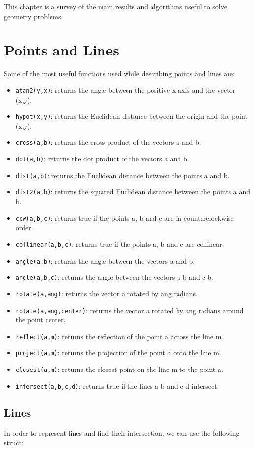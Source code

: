 This chapter is a survey of the main results and algorithms useful to solve geometry problems.

\section{Points and Lines}

Some of the most useful functions used while describing points and lines are:

\begin{itemize}
    \item \texttt{atan2(y,x)}: returns the angle between the positive x-axis and the vector (x,y).
    \item \texttt{hypot(x,y)}: returns the Euclidean distance between the origin and the point (x,y).
    \item \texttt{cross(a,b)}: returns the cross product of the vectors a and b.
    \item \texttt{dot(a,b)}: returns the dot product of the vectors a and b.
    \item \texttt{dist(a,b)}: returns the Euclidean distance between the points a and b.
    \item \texttt{dist2(a,b)}: returns the squared Euclidean distance between the points a and b.
    \item \texttt{ccw(a,b,c)}: returns true if the points a, b and c are in counterclockwise order.
    \item \texttt{collinear(a,b,c)}: returns true if the points a, b and c are collinear.
    \item \texttt{angle(a,b)}: returns the angle between the vectors a and b.
    \item \texttt{angle(a,b,c)}: returns the angle between the vectors a-b and c-b.
    \item \texttt{rotate(a,ang)}: returns the vector a rotated by ang radians.
    \item \texttt{rotate(a,ang,center)}: returns the vector a rotated by ang radians around the point center.
    \item \texttt{reflect(a,m)}: returns the reflection of the point a across the line m.
    \item \texttt{project(a,m)}: returns the projection of the point a onto the line m.
    \item \texttt{closest(a,m)}: returns the closest point on the line m to the point a.
    \item \texttt{intersect(a,b,c,d)}: returns true if the lines a-b and c-d intersect.
\end{itemize}




\subsection{Lines}

In order to represent lines and find their intersection, we can use the following struct:

